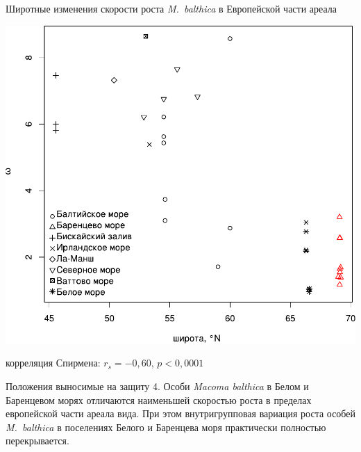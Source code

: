 \documentclass{beamer}
\begin{document}
\begin{frame}{Широтные изменения скорости роста {\it M.~balthica} в Европейской части ареала}
		\begin{center}
			\includegraphics[height=.7\textheight]{./long_vs_omega_ru.pdf}
		\end{center}
корреляция Спирмена: $r_{s} = -0,60$, $p < 0,0001$

\end{frame}

\begin{frame}{Положения выносимые на защиту}
4. Особи {\it Macoma balthica} в Белом и Баренцевом морях отличаются наименьшей скоростью роста в пределах европейской части ареала вида. 
При этом внутригрупповая вариация роста особей \textit{M.~balthica} в поселениях Белого и Баренцева моря практически полностью перекрывается.
\end{frame}

\end{document}
